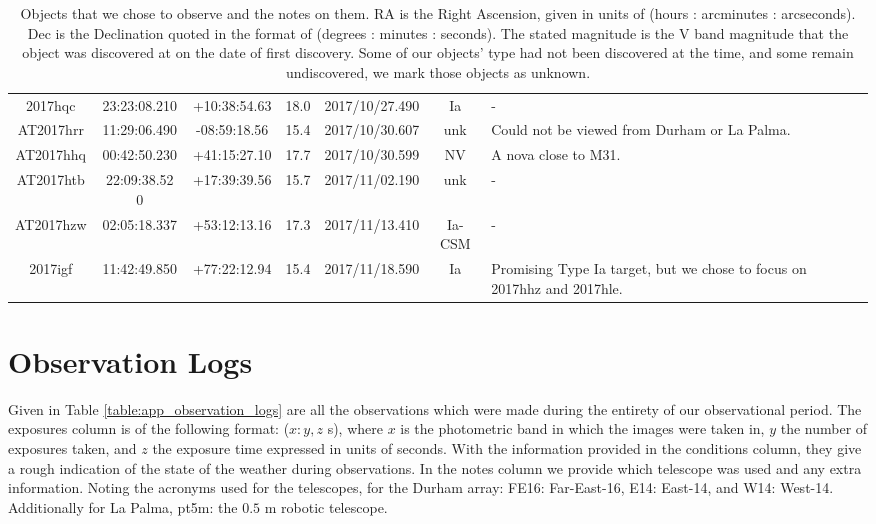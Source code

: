 \documentclass[twocolumn]{revtex4}
\begin{document}
{{\begin{table}[h!]
\begin{tabularx}{\textwidth}{c c c c @{\hskip 5pt} c c X}
    2017hqc & 23:23:08.210 & +10:38:54.63 & 18.0 & 2017/10/27.490 & Ia & {-}  \\
    AT2017hrr & 11:29:06.490 & -08:59:18.56 & 15.4 & 2017/10/30.607 & unk & {Could not be viewed from Durham or La Palma. }  \\
    AT2017hhq & 00:42:50.230 & +41:15:27.10 & 17.7 & 2017/10/30.599 & NV & {A nova close to M31.}  \\
    AT2017htb & 22:09:38.52 0 & +17:39:39.56 & 15.7 & 2017/11/02.190 & unk & {-}  \\
    AT2017hzw & 02:05:18.337 & +53:12:13.16 & 17.3 & 2017/11/13.410 & Ia-CSM & {-}  \\
    2017igf & 11:42:49.850 & +77:22:12.94 & 15.4 & 2017/11/18.590 & Ia & {Promising Type Ia target, but we chose to focus on 2017hhz and 2017hle.}  \\
    \hline      
\end{tabularx}
\caption{Objects that we chose to observe and the notes on them. RA is the Right Ascension, given in units of (hours : arcminutes : arcseconds). Dec is the Declination quoted in the format of (degrees : minutes : seconds). The stated magnitude is the V band magnitude that the object was discovered at on the date of first discovery. Some of our objects' type had not been discovered at the time, and some remain undiscovered, we mark those objects as unknown.}
\label{table:app_objects_log}
\end{table}


\clearpage

\onecolumngrid
\vspace{-3ex}
\section{Observation Logs} \label{app:observations_log}
\vspace{-2ex}
Given in Table \ref{table:app_observation_logs} are all the observations which were made during the entirety of our observational period. The exposures column is of the following format: ($x: y, z$ s), where $x$ is the photometric band in which the images were taken in, $y$ the number of exposures taken, and $z$ the exposure time expressed in units of seconds. With the information provided in the conditions column, they give a rough indication of the state of the weather during observations. In the notes column we provide which telescope was used and any extra information. Noting the acronyms used for the telescopes, for the Durham array: FE16: Far-East-16, E14: East-14, and W14: West-14. Additionally for La Palma, pt5m: the $0.5$ m robotic telescope.

}}
\end{document}
